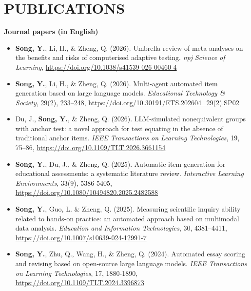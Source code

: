 \documentclass[a4paper,9pt]{extarticle}
\begin{document}
\section*{PUBLICATIONS}
\noindent
\textbf{Journal papers (in English)}
\begin{itemize}
    \item \textbf{Song, Y.}, Li, H., \& Zheng, Q. (2026). Umbrella review of meta-analyses on the benefits and risks of computerised adaptive testing. \textit{npj Science of Learning}, \url{https://doi.org/10.1038/s41539-026-00460-4}
    \item \textbf{Song, Y.}, Li, H., \& Zheng, Q. (2026). Multi-agent automated item generation based on large language models. \textit{Educational Technology \& Society}, 29(2), 233–248, \url{https://doi.org/10.30191/ETS.202604_29(2).SP02}
    \item Du, J., \textbf{Song, Y.}, \& Zheng, Q. (2026). LLM-simulated nonequivalent groups with anchor test: a novel approach for test equating in the absence of traditional anchor items. \textit{IEEE Transactions on Learning Technologies}, 19, 75–86, \url{https://doi.org/10.1109/TLT.2026.3661154}
    \item \textbf{Song, Y.}, Du, J., \& Zheng, Q. (2025). Automatic item generation for educational assessments: a systematic literature review. \textit{Interactive Learning Environments}, 33(9), 5386-5405, \url{https://doi.org/10.1080/10494820.2025.2482588}
    \item \textbf{Song, Y.}, Guo, L. \& Zheng, Q. (2025). Measuring scientific inquiry ability related to hands-on practice: an automated approach based on multimodal data analysis. \textit{Education and Information Technologies}, 30, 4381–4411, \url{https://doi.org/10.1007/s10639-024-12991-7}
    \item \textbf{Song, Y.}, Zhu, Q., Wang, H., \& Zheng, Q. (2024). Automated essay scoring and revising based on open-source large language models. \textit{IEEE Transactions on Learning Technologies}, 17, 1880-1890, \url{https://doi.org/10.1109/TLT.2024.3396873}
\end{itemize}
\end{document}

